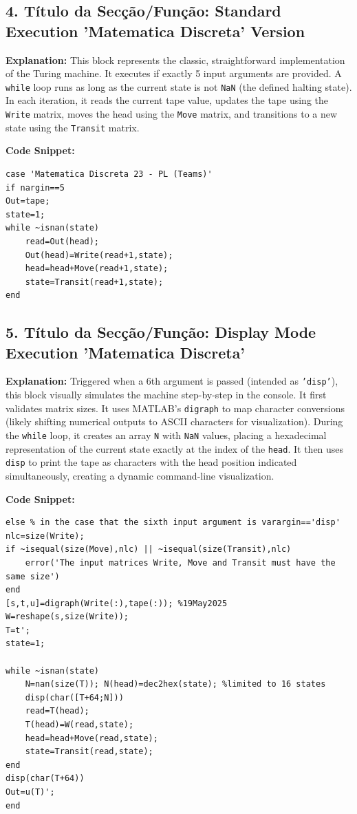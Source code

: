 \subsection*{4. Título da Secção/Função: Standard Execution 'Matematica Discreta' Version}
\textbf{Explanation:} This block represents the classic, straightforward implementation of the Turing machine. It executes if exactly 5 input arguments are provided. A \texttt{while} loop runs as long as the current state is not \texttt{NaN} (the defined halting state). In each iteration, it reads the current tape value, updates the tape using the \texttt{Write} matrix, moves the head using the \texttt{Move} matrix, and transitions to a new state using the \texttt{Transit} matrix.

\textbf{Code Snippet:}
\begin{lstlisting}
case 'Matematica Discreta 23 - PL (Teams)'
if nargin==5
Out=tape;
state=1;
while ~isnan(state)
    read=Out(head);
    Out(head)=Write(read+1,state);
    head=head+Move(read+1,state);
    state=Transit(read+1,state);
end
\end{lstlisting}

\subsection*{5. Título da Secção/Função: Display Mode Execution 'Matematica Discreta'}
\textbf{Explanation:} Triggered when a 6th argument is passed (intended as \texttt{'disp'}), this block visually simulates the machine step-by-step in the console. It first validates matrix sizes. It uses MATLAB's \texttt{digraph} to map character conversions (likely shifting numerical outputs to ASCII characters for visualization). During the \texttt{while} loop, it creates an array \texttt{N} with \texttt{NaN} values, placing a hexadecimal representation of the current state exactly at the index of the \texttt{head}. It then uses \texttt{disp} to print the tape as characters with the head position indicated simultaneously, creating a dynamic command-line visualization.

\textbf{Code Snippet:}
\begin{lstlisting}
else % in the case that the sixth input argument is varargin=='disp'
nlc=size(Write);
if ~isequal(size(Move),nlc) || ~isequal(size(Transit),nlc)
    error('The input matrices Write, Move and Transit must have the same size')
end
[s,t,u]=digraph(Write(:),tape(:)); %19May2025
W=reshape(s,size(Write));
T=t';
state=1;

while ~isnan(state)
    N=nan(size(T)); N(head)=dec2hex(state); %limited to 16 states
    disp(char([T+64;N]))
    read=T(head);
    T(head)=W(read,state);
    head=head+Move(read,state);
    state=Transit(read,state);
end
disp(char(T+64))
Out=u(T)';
end
\end{lstlisting}

